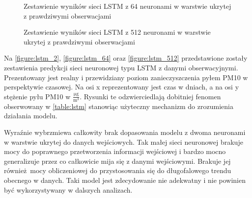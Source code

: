 \documentclass[10pt,a4paper]{article}
\begin{document}
\FloatBarrier
\begin{figure}[!ht]
	\centering
	\caption{Zestawienie wyników sieci LSTM z 64 neuronami w warstwie ukrytej z prawdziwymi obserwacjami}
	\label{figure:lstm_64}
\end{figure}
\FloatBarrier
\begin{figure}[!ht]
	\centering
	\caption{Zestawienie wyników sieci LSTM z 512 neuronami w warstwie ukrytej z prawdziwymi obserwacjami}
	\label{figure:lstm_512}
\end{figure}
\FloatBarrier

Na \autoref{figure:lstm_2}, \autoref{figure:lstm_64} oraz \autoref{figure:lstm_512} przedstawione zostały zestawienia predykcji sieci neuronowej typu LSTM z danymi obserwacyjnymi. Prezentowany jest realny i przewidziany poziom zanieczyszczenia pyłem PM10 w perspektywie czasowej. Na osi x reprezentowany jest czas w dniach, a na osi y stężenie pyłu PM10 w  $\frac{\si{\micro\gram}}{\si\meter^3}$. Rysunki te odzwierciedlają dobitniej fenomen obserwowany w \autoref{table:lstm} stanowiąc użyteczny mechanizm do zrozumienia działania modelu. 

Wyraźnie wybrzmiewa całkowity brak dopasowania modelu z dwoma neuronami w warstwie ukrytej do danych wejściowych. Tak małej sieci neuronowej brakuje mocy do poprawnego przetworzenia informacji wejściowej i bardzo mocno generalizuje przez co całkowicie mija się z danymi wejściowymi. Brakuje jej również mocy obliczeniowej do przystosowania się do długofalowego trendu obecnego w danych. Taki model jest zdecydowanie nie adekwatny i nie powinien być wykorzystywany w dalszych analizach. 
\end{document}
